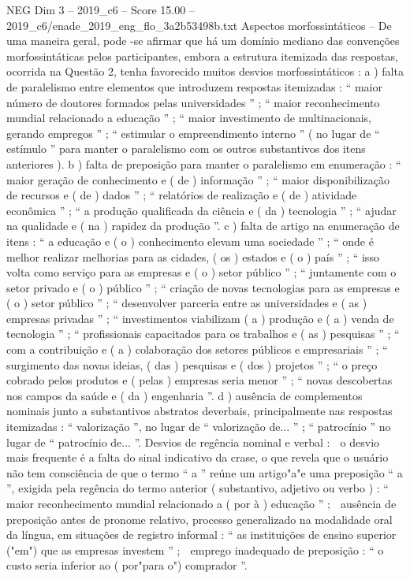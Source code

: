 \begin{textsample}{NEG Dim 3 – 2019\_c6 – Score 15.00 – 2019\_c6/enade\_2019\_eng\_flo\_3a2b53498b.txt}
Aspectos morfossintáticos – De uma maneira geral, pode -se afirmar que há um domínio mediano das convenções morfossintáticas pelos participantes, embora a estrutura itemizada das respostas, ocorrida na Questão 2, tenha favorecido muitos desvios morfossintáticos : a ) falta de paralelismo entre elementos que introduzem respostas itemizadas : “ maior número de doutores formados pelas universidades ” ; “ maior reconhecimento mundial relacionado a educação ” ; “ maior investimento de multinacionais, gerando empregos ” ; “ estimular o empreendimento interno ” ( no lugar de “ estímulo ” para manter o paralelismo com os outros substantivos dos itens anteriores ). b ) falta de preposição para manter o paralelismo em enumeração : “ maior geração de conhecimento e ( de ) informação ” ; “ maior disponibilização de recursos e ( de ) dados ” ; “ relatórios de realização e ( de ) atividade econômica ” ; “ a produção qualificada da ciência e ( da ) tecnologia ” ; “ ajudar na qualidade e ( na ) rapidez da produção ”. c ) falta de artigo na enumeração de itens : “ a educação e ( o ) conhecimento elevam uma sociedade ” ; “ onde é melhor realizar melhorias para as cidades, ( os ) estados e ( o ) país ” ; “ isso volta como serviço para as empresas e ( o ) setor público ” ; “ juntamente com o setor privado e ( o ) público ” ; “ criação de novas tecnologias para as empresas e ( o ) setor público ” ; “ desenvolver parceria entre as universidades e ( as ) empresas privadas ” ; “ investimentos viabilizam ( a ) produção e ( a ) venda de tecnologia ” ; “ profissionais capacitados para os trabalhos e ( as ) pesquisas ” ; “ com a contribuição e ( a ) colaboração dos setores públicos e empresariais ” ; “ surgimento das novas ideias, ( das ) pesquisas e ( dos ) projetos ” ; “ o preço cobrado pelos produtos e ( pelas ) empresas seria menor ” ; “ novas descobertas nos campos da saúde e ( da ) engenharia ”. d ) ausência de complementos nominais junto a substantivos abstratos deverbais, principalmente nas respostas itemizadas : “ valorização ”, no lugar de “ valorização de... ” ; “ patrocínio ” no lugar de “ patrocínio de... ”.
Desvios de regência nominal e verbal :  o desvio mais frequente é a falta do sinal indicativo da crase, o que revela que o usuário não tem consciência de que o termo “ a ” reúne um artigo"a"e uma preposição “ a ”, exigida pela regência do termo anterior ( substantivo, adjetivo ou verbo ) : “ maior reconhecimento mundial relacionado a ( por à ) educação ” ;  ausência de preposição antes de pronome relativo, processo generalizado na modalidade oral da língua, em situações de registro informal : “ as instituições de ensino superior ("em") que as empresas investem ” ;  emprego inadequado de preposição : “ o custo seria inferior ao ( por"para o") comprador ”.

\end{textsample}
